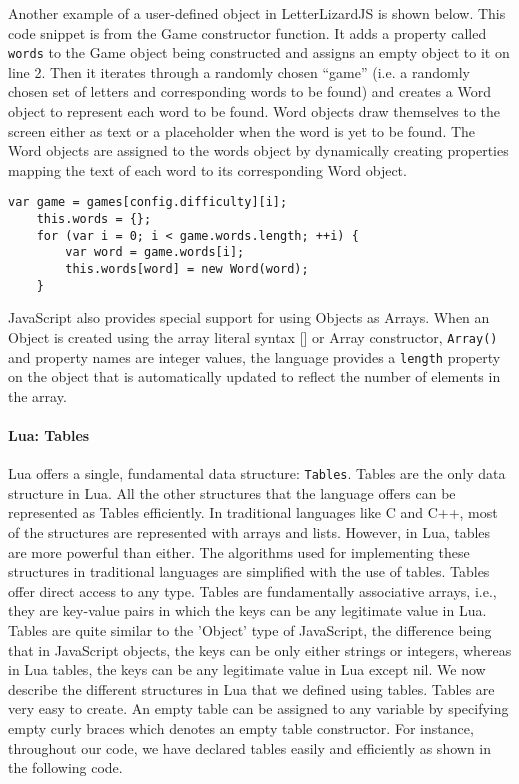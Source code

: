 Another example of a user-defined object in LetterLizardJS is shown below. This code
snippet is from the Game constructor function. It adds a property called 
\texttt{words} to the Game object being constructed and assigns an empty object
to it on line 2. Then it iterates through a randomly chosen ``game'' (i.e. a
randomly chosen set of letters and corresponding words to be found) and creates
a Word object to represent each word to be found. Word objects draw themselves to the
screen either as text or a placeholder when the word is yet to be found. The Word
objects are assigned to the words object by dynamically creating properties mapping
the text of each word to its corresponding Word object.

\begin{lstlisting}[caption=A user-defined object demonstrating dynamic properties.]
	var game = games[config.difficulty][i];
	this.words = {};
	for (var i = 0; i < game.words.length; ++i) {
		var word = game.words[i];
		this.words[word] = new Word(word);
	}
\end{lstlisting}

JavaScript also provides special support for using Objects as Arrays. When an Object 
is created using the array literal syntax [] or Array constructor, \texttt{Array()}
and property names are integer values, the language provides a \texttt{length} property
on the object that is automatically updated to reflect the number of elements in the array.

\paragraph{Lua: Tables}

Lua offers a single, fundamental data structure: \texttt{Tables}. Tables are the only data structure in Lua. All the other structures that the language offers can be represented as Tables efficiently. In traditional languages like C and C++, most of the structures are represented with arrays and lists. However, in Lua, tables are more powerful than either. The algorithms used for implementing these structures in traditional languages are simplified with the use of tables. Tables offer direct access to any type. Tables are fundamentally associative arrays, i.e., they are key-value pairs in which the keys can be any legitimate value in Lua. Tables are quite similar to the 'Object' type of JavaScript, the difference being that in JavaScript objects, the keys can be only either strings or integers, whereas in Lua tables, the keys can be any legitimate value in Lua except nil. We now describe the different structures in Lua that we defined using tables.
Tables are very easy to create. An empty table can be assigned to any variable by specifying empty curly braces which denotes an empty table constructor. For instance, throughout our code, we have declared tables easily and efficiently as shown in the following code.

